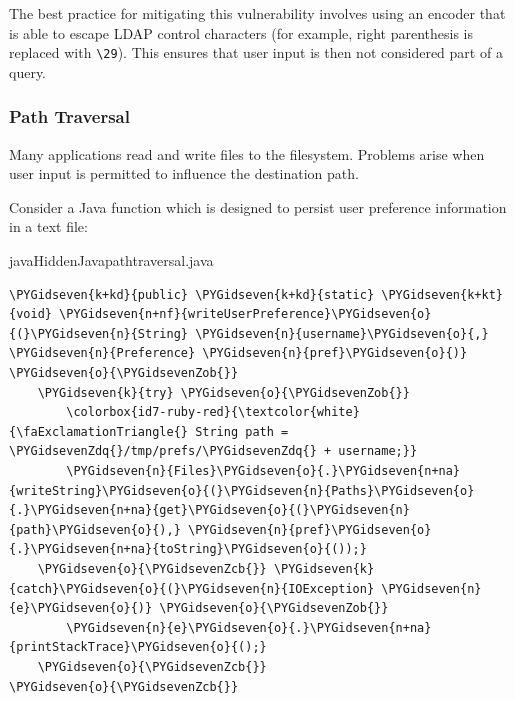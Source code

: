 The best practice for mitigating this vulnerability involves using an encoder that is able to escape LDAP control
characters (for example, right parenthesis is replaced with \texttt{\textbackslash 29}).
This ensures that user input is then not considered part of a query.

\subsubsection{Path Traversal}

Many applications read and write files to the filesystem.
Problems arise when user input is permitted to influence the destination path.

Consider a Java function which is designed to persist user preference information in a text file:

\newsavebox\myvb
\begin{lrbox}{\myvb}\begin{minipage}{\textwidth}
\begin{mycodefile}{java}{Hidden}{Java}{pathtraversal.java}\end{mycodefile}
\end{minipage}\end{lrbox}

\begin{mdframed}
\begin{Verbatim}[commandchars=\\\{\}]
\PYGidseven{k+kd}{public} \PYGidseven{k+kd}{static} \PYGidseven{k+kt}{void} \PYGidseven{n+nf}{writeUserPreference}\PYGidseven{o}{(}\PYGidseven{n}{String} \PYGidseven{n}{username}\PYGidseven{o}{,} \PYGidseven{n}{Preference} \PYGidseven{n}{pref}\PYGidseven{o}{)} \PYGidseven{o}{\PYGidsevenZob{}}
    \PYGidseven{k}{try} \PYGidseven{o}{\PYGidsevenZob{}}
        \colorbox{id7-ruby-red}{\textcolor{white}{\faExclamationTriangle{} String path = \PYGidsevenZdq{}/tmp/prefs/\PYGidsevenZdq{} + username;}}
        \PYGidseven{n}{Files}\PYGidseven{o}{.}\PYGidseven{n+na}{writeString}\PYGidseven{o}{(}\PYGidseven{n}{Paths}\PYGidseven{o}{.}\PYGidseven{n+na}{get}\PYGidseven{o}{(}\PYGidseven{n}{path}\PYGidseven{o}{),} \PYGidseven{n}{pref}\PYGidseven{o}{.}\PYGidseven{n+na}{toString}\PYGidseven{o}{());}
    \PYGidseven{o}{\PYGidsevenZcb{}} \PYGidseven{k}{catch}\PYGidseven{o}{(}\PYGidseven{n}{IOException} \PYGidseven{n}{e}\PYGidseven{o}{)} \PYGidseven{o}{\PYGidsevenZob{}}
        \PYGidseven{n}{e}\PYGidseven{o}{.}\PYGidseven{n+na}{printStackTrace}\PYGidseven{o}{();}
    \PYGidseven{o}{\PYGidsevenZcb{}}
\PYGidseven{o}{\PYGidsevenZcb{}}
\end{Verbatim}
\end{mdframed}

